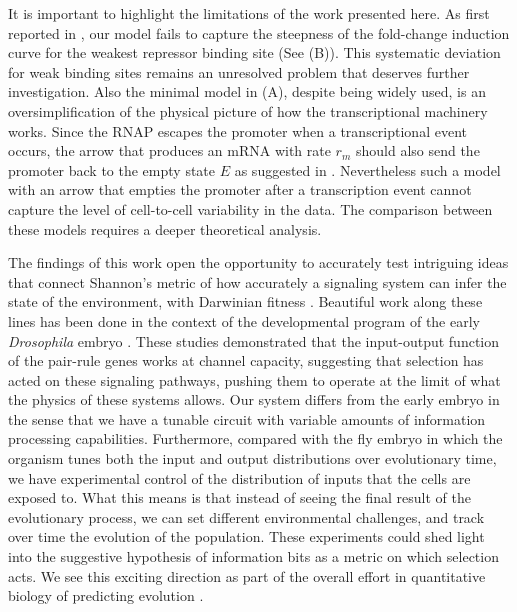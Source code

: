 It is important to highlight the limitations of the work presented here. As
first reported in \cite{Razo-Mejia2018}, our model fails to capture the
steepness of the fold-change induction curve for the weakest repressor binding
site (See (B)). This systematic deviation for weak binding
sites remains an unresolved problem that deserves further investigation. Also
the minimal model in (A), despite being widely used,
is an oversimplification of the physical picture of how the transcriptional
machinery works. Since the RNAP escapes the promoter when a transcriptional
event occurs, the arrow that produces an mRNA with rate $r_m$ should also send
the promoter back to the empty state $E$ as suggested in \cite{Phillips2015}.
Nevertheless such a model with an arrow that empties the promoter after a
transcription event cannot capture the level of cell-to-cell variability in the
data. The comparison between these models requires a deeper theoretical
analysis.

The findings of this work open the opportunity to accurately test intriguing
ideas that connect Shannon's metric of how accurately a signaling system can
infer the state of the environment, with Darwinian fitness \cite{Taylor2007}.
Beautiful work along these lines has been done in the context of the
developmental program of the early {\it Drosophila} embryo \cite{Tkacik2008,
Petkova2019}. These studies demonstrated that the input-output function of the
pair-rule genes works at channel capacity, suggesting that selection has
acted on these signaling pathways, pushing them to operate at the limit of what
the physics of these systems allows. Our system differs from the early embryo in
the sense that we have a tunable circuit with variable amounts of information
processing capabilities. Furthermore, compared with the fly embryo in which the
organism tunes both the input and output distributions over evolutionary time,
we have experimental control of the distribution of inputs that the cells are
exposed to. What this means is that instead of seeing the final result of the
evolutionary process, we can set different environmental challenges, and track
over time the evolution of the population. These experiments could shed light
into the suggestive hypothesis of information bits as a metric on which
selection acts. We see this exciting direction as part of the overall effort in
quantitative biology of predicting evolution \cite{Lassig2017}.
